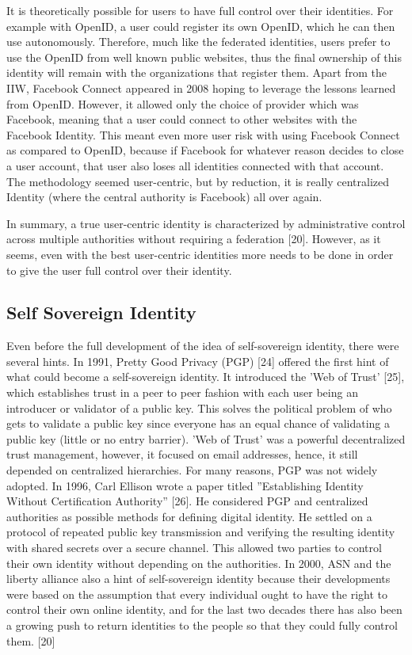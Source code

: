 It is theoretically possible for users to have full control over their identities. For example with OpenID, a user could register its own OpenID, which he can then use autonomously. Therefore, much like the federated identities, users prefer to use the OpenID from well known public websites, thus the final ownership of this identity will remain with the organizations that register them. Apart from the IIW, Facebook Connect appeared in 2008 hoping to leverage the lessons learned from OpenID. However, it allowed only the choice of provider which was Facebook, meaning that a user could connect to other websites with the Facebook Identity. This meant even more user risk with using Facebook Connect as compared to OpenID, because if Facebook for whatever reason decides to close a user account, that user also loses all identities connected with that account. The methodology seemed user-centric, but by reduction, it is really centralized Identity (where the central authority is Facebook) all over again.

In summary, a true user-centric identity is characterized by administrative control across multiple authorities without requiring a federation [20]. However, as it seems, even with the best user-centric identities more needs to be done in order to give the user full control over their identity.

\subsection{Self Sovereign Identity}

Even before the full development of the idea of self-sovereign identity, there were several hints. In 1991, Pretty Good Privacy (PGP) [24] offered the first hint of what could become a self-sovereign identity. It introduced the ’Web of Trust’ [25], which establishes trust in a peer to peer fashion with each user being an introducer or validator of a public key. This solves the political problem of who gets to validate a public key since everyone has an equal chance of validating a public key (little or no entry barrier). ’Web of Trust’ was a powerful decentralized trust management, however, it focused on email addresses, hence, it still depended on centralized hierarchies. For many reasons, PGP was not widely adopted. In 1996, Carl Ellison wrote a paper titled ”Establishing Identity Without Certification Authority” [26]. He considered PGP and centralized authorities as possible methods for defining digital identity. He settled on a protocol of repeated public key transmission and verifying the resulting identity with shared secrets over a secure channel. This allowed two parties to control their own identity without depending on the authorities. In 2000, ASN and the liberty alliance also a hint of self-sovereign identity because their developments were based on the assumption that every individual ought to have the right to control their own online identity, and for the last two decades there has also been a growing push to return identities to the people so that they could fully control them. [20] 

